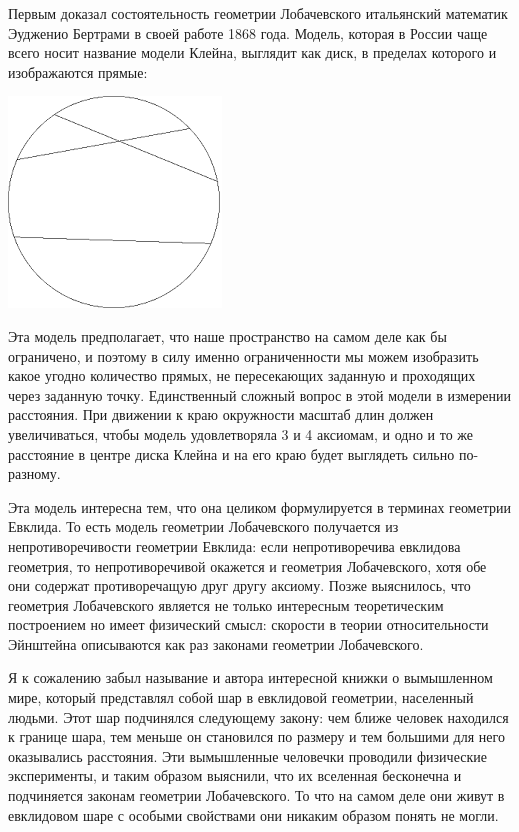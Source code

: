 Первым доказал состоятельность геометрии Лобачевского итальянский математик Эудженио Бертрами в своей работе 1868 года. Модель, которая в России чаще всего носит название модели Клейна, выглядит как диск, в пределах которого и изображаются прямые:

\includegraphics{klein.png}

Эта модель предполагает, что наше пространство на самом деле как бы ограничено, и поэтому в силу именно ограниченности мы можем изобразить какое угодно количество прямых, не пересекающих заданную и проходящих через заданную точку. Единственный сложный вопрос в этой модели в измерении расстояния. При движении к краю окружности масштаб длин должен увеличиваться, чтобы модель удовлетворяла 3 и 4 аксиомам, и одно и то же расстояние в центре диска Клейна и на его краю будет выглядеть сильно по-разному.

Эта модель интересна тем, что она целиком формулируется в терминах геометрии Евклида. То есть модель геометрии Лобачевского получается из непротиворечивости геометрии Евклида: если непротиворечива евклидова геометрия, то непротиворечивой окажется и геометрия Лобачевского, хотя обе они содержат противоречащую друг другу аксиому. Позже выяснилось, что геометрия Лобачевского является не только интересным теоретическим построением но имеет физический смысл: скорости в теории относительности Эйнштейна описываются как раз законами геометрии Лобачевского.

Я к сожалению забыл называние и автора интересной книжки о вымышленном мире, который представлял собой шар в евклидовой геометрии, населенный людьми. Этот шар подчинялся следующему закону: чем ближе человек находился к границе шара, тем меньше он становился по размеру и тем большими для него оказывались расстояния. Эти вымышленные человечки проводили физические эксперименты, и таким образом выяснили, что их вселенная бесконечна и подчиняется законам геометрии Лобачевского. То что на самом деле они живут в евклидовом шаре с особыми свойствами они никаким образом понять не могли.

